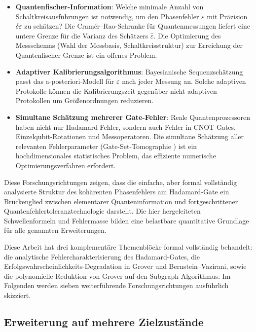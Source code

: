 ﻿\documentclass[11pt,a4paper]{article}
\theoremstyle{definition}
\newcommand{\eps}{\varepsilon}
\begin{document}
\begin{itemize}
  \item \textbf{Quantenfischer-Information}: Welche minimale Anzahl von
        Schaltkreisausführungen ist notwendig, um den Phasenfehler $\eps$
        mit Präzision $\delta\eps$ zu schätzen?  Die Cramér--Rao-Schranke
        für Quantenmessungen \cite{Braunstein1994} liefert eine untere Grenze
        für die Varianz des Schätzers $\hat\eps$.  Die Optimierung des
        Messschemas (Wahl der Messbasis, Schaltkreisstruktur) zur Erreichung
        der Quantenfischer-Grenze ist ein offenes Problem.

  \item \textbf{Adaptiver Kalibrierungsalgorithmus}: Bayesianische
        Sequenzschätzung \cite{Granade2012} passt das a-posteriori-Modell
        für $\eps$ nach jeder Messung an.  Solche adaptiven Protokolle
        können die Kalibrierungszeit gegenüber nicht-adaptiven Protokollen
        um Größenordnungen reduzieren.

  \item \textbf{Simultane Schätzung mehrerer Gate-Fehler}: Reale
        Quantenprozessoren haben nicht nur Hadamard-Fehler, sondern auch
        Fehler in CNOT-Gates, Einzelqubit-Rotationen und Messoperatoren.
        Die simultane Schätzung aller relevanten Fehlerparameter
        (Gate-Set-Tomographie \cite{Blume-Kohout2017}) ist ein
        hochdimensionales statistisches Problem, das effiziente
        numerische Optimierungsverfahren erfordert.
\end{itemize}

Diese Forschungsrichtungen zeigen, dass die einfache, aber formal vollständig
analysierte Struktur des kohärenten Phasenfehlers am Hadamard-Gate ein
Brückenglied zwischen elementarer Quanteninformation und fortgeschrittener
Quantenfehlertoleranztechnologie darstellt.  Die hier hergeleiteten
Schwellenformeln und Fehlermasse bilden eine belastbare quantitative Grundlage
für alle genannten Erweiterungen.


Diese Arbeit hat drei komplementäre Themenblöcke formal vollständig behandelt:
die analytische Fehlercharakterisierung des Hadamard-Gates, die
Erfolgswahrscheinlichkeits-Degradation in Grover und Bernstein--Vazirani,
sowie die polynomielle Reduktion von Grover auf den Subgraph Algorithmus.
Im Folgenden werden sieben weiterführende Forschungsrichtungen ausführlich
skizziert.

\subsection{Erweiterung auf mehrere Zielzustände}
\label{subsec:outlook_multi}
\end{document}
